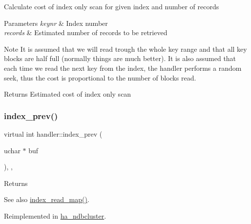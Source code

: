 Calculate cost of \textquotesingle{}index only\textquotesingle{} scan for given index and number of records


\begin{DoxyParams}{Parameters}
{\em keynr} & Index number \\
\hline
{\em records} & Estimated number of records to be retrieved\\
\hline
\end{DoxyParams}
\begin{DoxyNote}{Note}
It is assumed that we will read trough the whole key range and that all key blocks are half full (normally things are much better). It is also assumed that each time we read the next key from the index, the handler performs a random seek, thus the cost is proportional to the number of blocks read.
\end{DoxyNote}
\begin{DoxyReturn}{Returns}
Estimated cost of \textquotesingle{}index only\textquotesingle{} scan 
\end{DoxyReturn}
\mbox{\label{classhandler_a1ab892ae78db6437119d2d25621118b7}} 
\subsubsection{\texorpdfstring{index\+\_\+prev()}{index\_prev()}}
{\footnotesize\ttfamily virtual int handler\+::index\+\_\+prev (\begin{DoxyParamCaption}\item[{uchar $\ast$}]{buf }\end{DoxyParamCaption})\hspace{0.3cm}{\ttfamily [inline]}, {\ttfamily [protected]}, {\ttfamily [virtual]}}

\begin{DoxyReturn}{Returns}

\end{DoxyReturn}
\begin{DoxySeeAlso}{See also}
\mbox{\hyperlink{classhandler_af8c2b258691e5baac8dd22d19c084b37}{index\+\_\+read\+\_\+map()}}. 
\end{DoxySeeAlso}


Reimplemented in \mbox{\hyperlink{classha__ndbcluster_a824559f84d7f256052f0394e9276774f}{ha\+\_\+ndbcluster}}.

\mbox{\label{classhandler_acba0c549a00023dd44682cd9452cf830}} 
